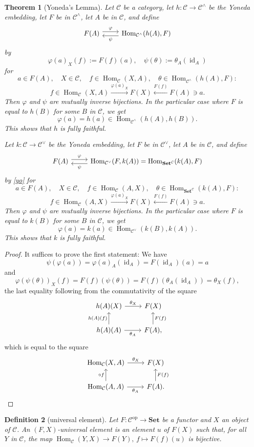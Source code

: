 \documentclass[12pt]{article}
\newtheorem{thm}{Theorem}
\newtheorem{df}[thm]{Definition}
\theoremstyle{remark}
\theoremstyle{definition}
\newcommand{\C}{\mathcal C}
\newcommand{\Set}{\mathbf{Set}}
\newcommand{\pp}{\varphi}
\newcommand{\xr}{\xrightarrow}
\DeclareMathOperator{\id}{id}
\DeclareMathOperator{\Hom}{Hom}
\DeclareMathOperator{\op}{op}
\begin{document}
\begin{thm}[Yoneda's Lemma]\label{yol}
Let $\C$ be a category, let $h:\C\to\C^\wedge$ be the Yoneda embedding, let $F$ be in $\C^\wedge$, let $A$ be in $\C$, and define 
$$
\begin{tikzcd} 
F(A)\ar[yshift=0.7ex]{r}{\pp}&\Hom_{\C^\wedge}(h(A),F)\ar[yshift=-0.7ex]{l}{\psi}
\end{tikzcd}
$$
by 
\begin{equation}\label{yo}
\pp(a)_X(f):=F(f)(a),\quad\psi(\theta):=\theta_A(\id_A)
\end{equation}
for 
$$
a\in F(A),\quad X\in\C,\quad f\in\Hom_\C(X,A),\quad\theta\in\Hom_{\C^\wedge}(h(A),F):
$$ 
$$
f\in\Hom_\C(X,A)\xr{\pp(a)_X}F(X)\xleftarrow{F(f)}F(A)\ni a.
$$
Then $\pp$ and $\psi$ are mutually inverse bijections. In the particular case where $F$ is equal to $h(B)$ for some $B$ in $\C$, we get 
$$
\pp(a)=h(a)\in\Hom_{\C^\wedge}(h(A),h(B)).
$$
This shows that $h$ is fully faithful.

Let $k:\C\to\C^\vee$ be the Yoneda embedding, let $F$ be in $\C^\vee$, let $A$ be in $\C$, and define 
$$
\begin{tikzcd} 
F(A)\ar[yshift=0.7ex]{r}{\pp}&\Hom_{\C^\vee}(F,k(A))=\Hom_{\Set^\C}(k(A),F)\ar[yshift=-0.7ex]{l}{\psi}
\end{tikzcd}
$$
by \eqref{yo} for 
$$
a\in F(A),\quad X\in\C,\quad f\in\Hom_\C(A,X),\quad\theta\in\Hom_{\Set^\C}(k(A),F):
$$ 
$$
f\in\Hom_\C(A,X)\xr{\pp(a)_X}F(X)\xleftarrow{F(f)}F(A)\ni a.
$$
Then $\pp$ and $\psi$ are mutually inverse bijections. In the particular case where $F$ is equal to $k(B)$ for some $B$ in $\C$, we get 
$$
\pp(a)=k(a)\in\Hom_{\C^\vee}(k(B),k(A)).
$$
This shows that $k$ is fully faithful.
\end{thm}
%
\begin{proof}
It suffices to prove the first statement: We have 
$$
\psi(\pp(a))=\pp(a)_A(\id_A)=F(\id_A)(a)=a
$$ 
and
$$
\pp(\psi(\theta))_X(f)=F(f)(\psi(\theta))=F(f)(\theta_A(\id_A))=\theta_X(f),
$$ 
the last equality following from the commutativity of the square 
$$
\begin{tikzcd}
h(A)(X)\ar{r}{\theta_X}&F(X)\\ 
h(A)(A)\ar{u}{h(A)(f)}\ar{r}[swap]{\theta_A}&F(A),\ar{u}[swap]{F(f)}
\end{tikzcd}
$$ 
which is equal to the square 
$$
\begin{tikzcd}
\Hom_\C(X,A)\ar{r}{\theta_X}&F(X)\\ 
\Hom_\C(A,A)\ar{u}{\circ f}\ar{r}[swap]{\theta_A}&F(A).\ar{u}[swap]{F(f)}
\end{tikzcd}
$$
\end{proof}
%
\begin{df}[universal element]\label{ue} 
Let $F:\C^{\op}\to\Set$ be a functor and $X$ an object of $\C$. An $(F,X)$\--{\em universal element} is an element $u$ of $F(X)$ such that, for all $Y$ in $\C$, the map $\Hom_\C(Y,X)\to F(Y),\ f\mapsto F(f)(u)$ is bijective. 
\end{df}
\end{document}
